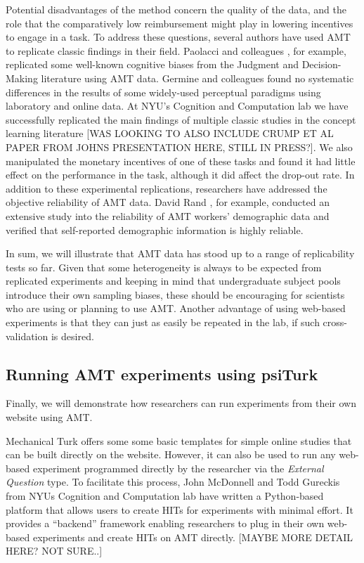 \documentclass[10pt,letterpaper]{article}
\begin{document}
Potential disadvantages of the method concern the quality of the data, and the role that the comparatively low reimbursement might play in lowering incentives to engage in a task.
To address these questions, several authors have used AMT to replicate classic findings in their field.
Paolacci and colleagues \citeyear{paolacci2010running}, for example, replicated some well-known  cognitive biases from the Judgment and Decision-Making literature using AMT data.
Germine and colleagues \citeyear{germine2012web}  found no systematic differences in the results of  some widely-used perceptual paradigms using laboratory and online data.
At NYU's Cognition and Computation lab we have successfully replicated the main findings of multiple classic studies in the concept learning literature [WAS LOOKING TO ALSO INCLUDE CRUMP ET AL PAPER FROM JOHNS PRESENTATION HERE, STILL IN PRESS?].
We also manipulated the monetary incentives of one of these tasks and found it had little effect on the performance in the task, although it did affect the drop-out rate.
In addition to these experimental replications, researchers have addressed the objective reliability of AMT data.
David Rand \citeyear{rand2012promise}, for example, conducted an extensive study into the reliability of AMT workers' demographic data  and verified that self-reported demographic information is highly reliable.

In sum, we will illustrate that AMT data has stood up to a range of replicability tests so far.
Given that some heterogeneity is always to be expected from replicated experiments and keeping in mind that undergraduate subject pools introduce their own sampling biases, these should be encouraging for scientists who are using or planning to use AMT.
Another advantage of using web-based experiments is that they can just as easily be repeated in the lab, if such cross-validation is desired.


\subsection{Running AMT experiments using psiTurk}
Finally, we will demonstrate how researchers can run experiments from their own website using AMT.

Mechanical Turk offers some some basic templates for simple online studies that can be built directly on the website.
However, it can also be used to run any web-based experiment programmed directly by the researcher via the \emph{External Question} type.
To facilitate this process, John McDonnell and Todd Gureckis from NYUs Cognition and Computation lab have written a Python-based platform that allows users to create  HITs for experiments with minimal effort.
It provides a ``backend'' framework enabling researchers to plug in their own web-based experiments and create HITs on AMT directly.
[MAYBE MORE DETAIL HERE? NOT SURE..]
\end{document}
